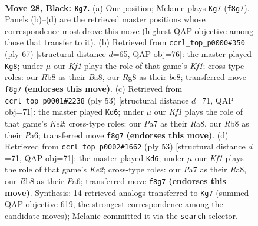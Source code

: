 \documentclass[11pt]{article}
\begin{document}
\clearpage

\begin{figure}[p]\centering
\begin{subfigure}{0.46\textwidth}\centering
\resizebox{\linewidth}{!}{%
\newchessgame
\chessboard[
  setfen={1rbQ1kr1/p1p2p2/2p1p2p/2P3p1/8/3B4/P6q/R2KR3 b - - 6 28},
  showmover=false,
  pgfstyle=straightmove, color=movearrow, markmove={f8-g7}
]}
\caption{}
\end{subfigure}\hfill
\begin{subfigure}{0.46\textwidth}\centering
\resizebox{\linewidth}{!}{%
\newchessgame
\chessboard[
  setfen={b3Bk2/q4p2/r2b3Q/p2p1p2/1p6/7P/PP3P2/4RK2 b - - 2 34},
  showmover=false,
  pgfstyle=straightmove, color=movearrow, markmove={f8-g8}
]}
\caption{}
\end{subfigure}
\\[4pt]
\begin{subfigure}{0.46\textwidth}\centering
\resizebox{\linewidth}{!}{%
\newchessgame
\chessboard[
  setfen={r7/4k1Qp/pq2pp2/3bp2B/2p5/8/P1P3PP/3R3K b - - 3 27},
  showmover=false,
  pgfstyle=straightmove, color=movearrow, markmove={e7-d6}
]}
\caption{}
\end{subfigure}\hfill
\begin{subfigure}{0.46\textwidth}\centering
\resizebox{\linewidth}{!}{%
\newchessgame
\chessboard[
  setfen={r7/4k1Qp/pq2pp2/3bp2B/2p5/8/P1P3PP/3R3K b - - 3 27},
  showmover=false,
  pgfstyle=straightmove, color=movearrow, markmove={e7-d6}
]}
\caption{}
\end{subfigure}
\caption{\textbf{Move 28, Black: \texttt{Kg7}.} (a) Our position; Melanie plays \texttt{Kg7} (\texttt{f8g7}). Panels (b)--(d) are the retrieved master positions whose correspondence most drove this move (highest QAP objective among those that transfer to it). (b) Retrieved from \texttt{ccrl\_top\_p0000\#350} (ply 67) [structural distance $d$=65, QAP obj=76]: the master played \texttt{Kg8}; under $\mu$ our \emph{Kf1} plays the role of that game's \emph{Kf1}; cross-type roles: our \emph{R}b8 as their \emph{B}a8, our \emph{R}g8 as their \emph{b}e8; transferred move \texttt{f8g7} \textbf{(endorses this move)}. (c) Retrieved from \texttt{ccrl\_top\_p0001\#2238} (ply 53) [structural distance $d$=71, QAP obj=71]: the master played \texttt{Kd6}; under $\mu$ our \emph{Kf1} plays the role of that game's \emph{Ke2}; cross-type roles: our \emph{P}a7 as their \emph{R}a8, our \emph{R}b8 as their \emph{P}a6; transferred move \texttt{f8g7} \textbf{(endorses this move)}. (d) Retrieved from \texttt{ccrl\_top\_p0002\#1662} (ply 53) [structural distance $d$=71, QAP obj=71]: the master played \texttt{Kd6}; under $\mu$ our \emph{Kf1} plays the role of that game's \emph{Ke2}; cross-type roles: our \emph{P}a7 as their \emph{R}a8, our \emph{R}b8 as their \emph{P}a6; transferred move \texttt{f8g7} \textbf{(endorses this move)}. Synthesis: 14 retrieved analogs transferred to \texttt{Kg7} (summed QAP objective 619, the strongest correspondence among the candidate moves); Melanie committed it via the \texttt{search} selector.}
\label{fig:thought-m55}
\end{figure}
\end{document}
